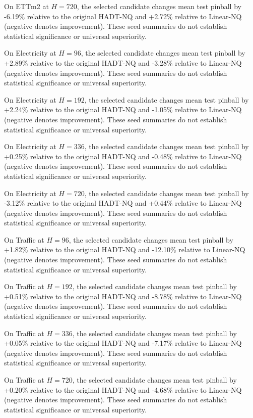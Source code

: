 On ETTm2 at $H=720$, the selected candidate changes mean test pinball by -6.19\% relative to the original HADT-NQ and +2.72\% relative to Linear-NQ (negative denotes improvement). These seed summaries do not establish statistical significance or universal superiority.

On Electricity at $H=96$, the selected candidate changes mean test pinball by +2.89\% relative to the original HADT-NQ and -3.28\% relative to Linear-NQ (negative denotes improvement). These seed summaries do not establish statistical significance or universal superiority.

On Electricity at $H=192$, the selected candidate changes mean test pinball by +2.24\% relative to the original HADT-NQ and -1.05\% relative to Linear-NQ (negative denotes improvement). These seed summaries do not establish statistical significance or universal superiority.

On Electricity at $H=336$, the selected candidate changes mean test pinball by +0.25\% relative to the original HADT-NQ and -0.48\% relative to Linear-NQ (negative denotes improvement). These seed summaries do not establish statistical significance or universal superiority.

On Electricity at $H=720$, the selected candidate changes mean test pinball by -3.12\% relative to the original HADT-NQ and +0.44\% relative to Linear-NQ (negative denotes improvement). These seed summaries do not establish statistical significance or universal superiority.

On Traffic at $H=96$, the selected candidate changes mean test pinball by +1.82\% relative to the original HADT-NQ and -12.10\% relative to Linear-NQ (negative denotes improvement). These seed summaries do not establish statistical significance or universal superiority.

On Traffic at $H=192$, the selected candidate changes mean test pinball by +0.51\% relative to the original HADT-NQ and -8.78\% relative to Linear-NQ (negative denotes improvement). These seed summaries do not establish statistical significance or universal superiority.

On Traffic at $H=336$, the selected candidate changes mean test pinball by +0.05\% relative to the original HADT-NQ and -7.17\% relative to Linear-NQ (negative denotes improvement). These seed summaries do not establish statistical significance or universal superiority.

On Traffic at $H=720$, the selected candidate changes mean test pinball by +0.20\% relative to the original HADT-NQ and -4.68\% relative to Linear-NQ (negative denotes improvement). These seed summaries do not establish statistical significance or universal superiority.

